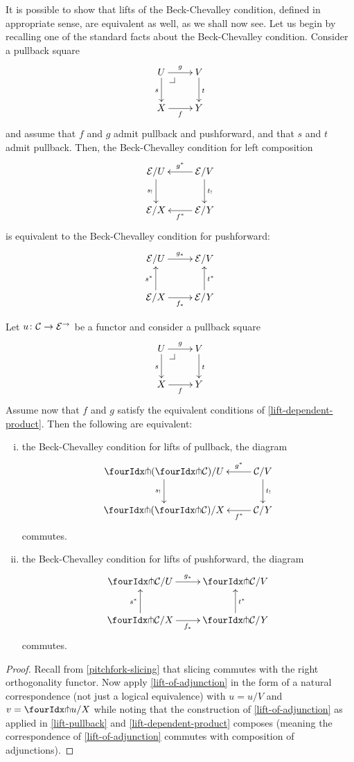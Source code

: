 \documentclass[reqno,10pt,a4paper,oneside]{amsart}
\begin{document}
It is possible to show that lifts of the Beck-Chevalley condition, defined in appropriate sense, are equivalent as well, as we shall now see. Let us begin by recalling one of the standard facts about the Beck-Chevalley condition. Consider a
pullback square 
\[
\xymatrix{
  U
  \ar[d]_{s}
  \ar[r]^{g}
  \pullback{dr}
&
  V
  \ar[d]^{t}
\\
  X
  \ar[r]_{f}
&
  Y
}
\]
and assume that $f$ and $g$ admit pullback and pushforward, and that $s$ and $t$ admit pullback. Then,
 the Beck-Chevalley condition for left composition
\[
\xymatrix{
  \catE/U
  \ar[d]_{s_!}
&
  \catE/V
  \ar[l]_{g^*}
  \ar[d]^{t_!}
\\
  \catE/X
&
  \catE/Y
  \ar[l]^{f^*}
}
\]
is equivalent to the Beck-Chevalley condition for pushforward:
\[
\xymatrix{
  \catE/U
  \ar[r]^{g_*}
&
  \catE/V
\\
  \catE/X
  \ar[r]_{f_*}
  \ar[u]^{s^*}
&
  \catE/Y
  \ar[u]_{t^*}
}
\]





\begin{proposition}
\label{lift-pushforward-BC} Let $u \colon \mathcal{C} \to \mathcal{E}^{\to}$ be a functor and consider a 
pullback square
\[
\xymatrix{
  U
  \ar[d]_{s}
  \ar[r]^{g}
  \pullback{dr}
&
  V
  \ar[d]^{t}
\\
  X
  \ar[r]_{f}
&
  Y
}
\]
Assume now that $f$ and $g$ satisfy the equivalent conditions of \cref{lift-dependent-product}.
Then the following are equivalent:
\begin{enumerate}[(i)]
\item the Beck-Chevalley condition for lifts of pullback, \ie the diagram
\[
\xymatrix{
  \liftl{(\liftr{\cal{C}})}/U
  \ar[d]_{s_!}
&
  \cal{C}/V
  \ar[l]_-{g^*}
  \ar[d]^{t_!}
\\
  \liftl{(\liftr{\cal{C}})}/X
&
  \cal{C}/Y
  \ar[l]^-{f^*}
}
\]
commutes. 
\item the Beck-Chevalley  condition for lifts of pushforward, \ie the diagram
\[
\xymatrix{
  \liftr{\cal{C}}/U
  \ar[r]^{g_*}
&
  \liftr{\cal{C}}/V
\\
  \liftr{\cal{C}}/X
  \ar[r]_{f_*}
  \ar[u]^{s^*}
&
  \liftr{\cal{C}}/Y
  \ar[u]_{t^*}
}
\]
commutes.
\end{enumerate}
\end{proposition}

\begin{proof}
Recall from \cref{pitchfork-slicing} that slicing commutes with the right orthogonality functor.
Now apply \cref{lift-of-adjunction} in the form of a natural correspondence (not just a logical equivalence) with $u = u/V$ and $v = \liftr{u}/X$ while noting that the construction of \cref{lift-of-adjunction} as applied in \cref{lift-pullback} and \cref{lift-dependent-product} composes (meaning the correspondence of \cref{lift-of-adjunction} commutes with composition of adjunctions).
\end{proof}
\end{document}
